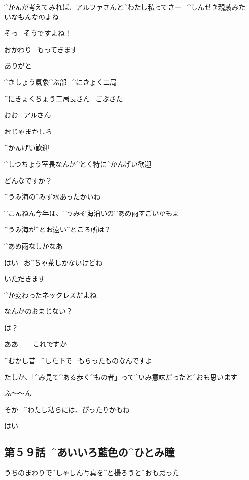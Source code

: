 \page
\Sensei ^{かんが}{考}えてみれば、アルファさんと^{わたし}{私}ってさー
\ ^{しんせき}{親戚}みたいなもんなのよね

\Alpha そっ
\ そうですよね！

\page
\Alpha おかわり
\ もってきます

\Sensei ありがと

\page[49]
\Sign ^{きしょう}{氣象}^{ぶ}{部}
\ ^{にきょく}{二局}

\page
\ASevenMOne ^{にきょくちょう}{二局長}さん
\ ごぶさた

\Person おお
\ アルさん

\ASevenMOne おじゃまかしら

\Person ^{かんげい}{歓迎}

\Person ^{しつちょう}{室長}なんか^{とく}{特}に^{かんげい}{歓迎}

\page
\ASevenMOne どんなですか？

\Person ^{うみ}{海}の^{みず}{水}あったかいね

\Person ^{こんねん}{今年}は、^{うみぞ}{海沿}いの^{あめ}{雨}すごいかもよ

\ASevenMOne ^{うみ}{海}が^{とお}{遠}い^{ところ}{所}は？

\Person ^{あめ}{雨}なしかなあ

\Person はい
\ お^{ちゃ}{茶}しかないけどね

\ASevenMOne いただきます

\page[53]
\Person ^{か}{変}わったネックレスだよね

\Person なんかのおまじない？

\ASevenMOne は？

\ASevenMOne ああ……
\ これですか

\page
\ASevenMOne ^{むかし}{昔}
\ ^{した}{下}で
\ もらったものなんですよ

\ASevenMOne たしか、「^{み}{見}て^{ある}{歩}く^{もの}{者}」って^{いみ}{意味}だったと^{おも}{思}います

\Person ふ〜〜ん

\page
\Person そか
\ ^{わたし}{私}らには、ぴったりかもね

\ASevenMOne はい


\subsection{第５９話\ ^{あいいろ}{藍色}の^{ひとみ}{瞳}}

\page[58]
\Alpha うちのまわりで^{しゃしん}{写真}を^{と}{撮}ろうと^{おも}{思}った

